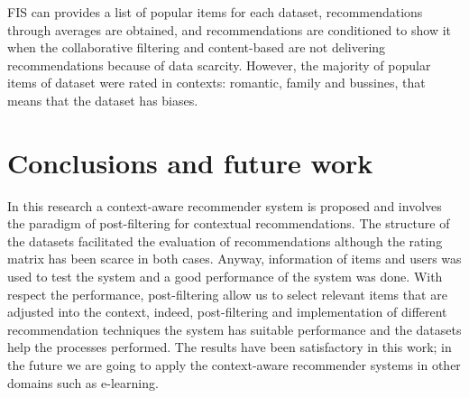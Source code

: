 FIS can provides a list of popular items for each dataset, recommendations
through averages are obtained, and recommendations are conditioned to show it
when the collaborative filtering and content-based are not delivering recommendations because of
data scarcity. However, the majority of popular items of dataset were rated in
contexts: romantic, family and bussines, that means that the dataset has
biases.

\section{Conclusions and future work} \label{sec:6}

In this research a context-aware recommender system is proposed and involves the
paradigm of post-filtering for contextual recommendations. The structure of the
datasets facilitated the evaluation of recommendations although the rating
matrix has been scarce in both cases. Anyway, information of items and users was
used to test  the system and a good performance of the system was done. With
respect the performance, post-filtering allow us to select relevant items that
are adjusted into the context, indeed, post-filtering and implementation of
different recommendation techniques the system has suitable performance and the
datasets help the processes performed. The results have been satisfactory in
this work; in the future we are going to apply the context-aware recommender
systems in other domains such as e-learning.









